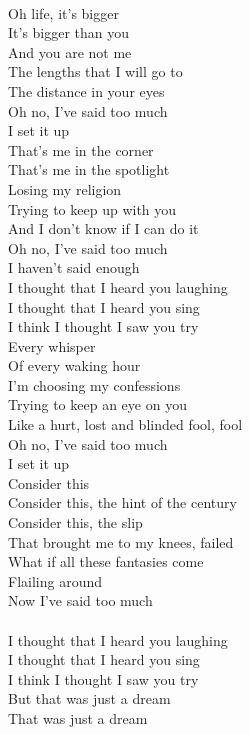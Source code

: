 {\\
Oh life, it's bigger\\
It's bigger than you\\
And you are not me\\
The lengths that I will go to\\
The distance in your eyes\\
Oh no, I've said too much\\
I set it up
}
{\\
That's me in the corner\\
That's me in the spotlight\\
Losing my religion\\
Trying to keep up with you\\
And I don't know if I can do it\\
Oh no, I've said too much\\
I haven't said enough
}
{\\
I thought that I heard you laughing\\
I thought that I heard you sing\\
I think I thought I saw you try
}
{\\
Every whisper\\
Of every waking hour\\
I'm choosing my confessions\\
Trying to keep an eye on you\\
Like a hurt, lost and blinded fool, fool\\
Oh no, I've said too much\\
I set it up
}
{\\
Consider this\\
Consider this, the hint of the century\\
Consider this, the slip\\
That brought me to my knees, failed\\
What if all these fantasies come\\
Flailing around\\
Now I've said too much\\
}
{\\
I thought that I heard you laughing\\
I thought that I heard you sing\\
I think I thought I saw you try\\
}
{
But that was just a dream\\
That was just a dream\\
}

